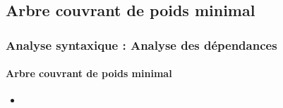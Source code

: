 \documentclass[xcolor=table]{beamer}
\begin{document}
\subsection{Arbre couvrant de poids minimal}

\begin{frame}
\frametitle{Analyse syntaxique : Analyse des dépendances}
\framesubtitle{Arbre couvrant de poids minimal}

\begin{itemize}
	\item 
\end{itemize}

\end{frame}

\end{document}
